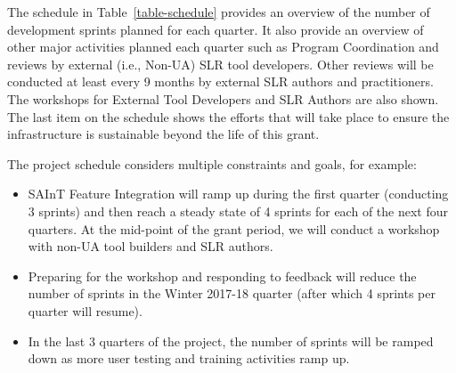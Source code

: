 
The schedule in Table~\ref{table-schedule} provides an overview of the number of development sprints planned for each quarter.  
It also provide an overview of other major activities planned each quarter such as Program Coordination and reviews by external (i.e., Non-UA) SLR  tool developers.  
Other reviews will be conducted at least every 9 months by external SLR authors and practitioners. 
The workshops for External Tool Developers and SLR Authors are also shown.   
The last item on the schedule shows the efforts that will take place to ensure the infrastructure is sustainable beyond the life of this grant. 

The project schedule considers multiple constraints and goals, for example:
\vspace{-8pt}
\begin{itemize}
	\item SAInT Feature Integration will ramp up during the first quarter (conducting 3 sprints) and then reach a steady state of 4 sprints for each of the next four quarters.  
	At the mid-point of the grant period, we will conduct a workshop with non-UA tool builders and SLR authors.  
	\item Preparing for the workshop and responding to feedback will reduce the number of sprints in the Winter 2017-18 quarter (after which 4 sprints per quarter will resume).  
	\item In the last 3 quarters of the project, the number of sprints will be ramped down as more user testing and training activities ramp up.
	\vspace{-4pt}
\end{itemize}
\vspace{-4pt}

